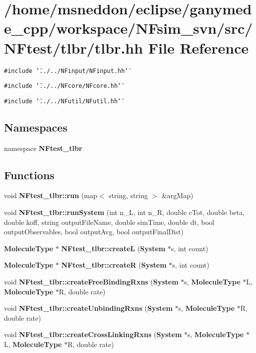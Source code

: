 \section{/home/msneddon/eclipse/ganymede\_\-cpp/workspace/NFsim\_\-svn/src/NFtest/tlbr/tlbr.hh File Reference}
\label{tlbr_8hh}


{\tt \#include \char`\"{}../../NFinput/NFinput.hh\char`\"{}}\par
{\tt \#include \char`\"{}../../NFcore/NFcore.hh\char`\"{}}\par
{\tt \#include \char`\"{}../../NFutil/NFutil.hh\char`\"{}}\par
\subsection*{Namespaces}
\begin{CompactItemize}
\item 
namespace {\bf NFtest\_\-tlbr}
\end{CompactItemize}
\subsection*{Functions}
\begin{CompactItemize}
\item 
void {\bf NFtest\_\-tlbr::run} (map$<$ string, string $>$ \&argMap)
\item 
void {\bf NFtest\_\-tlbr::runSystem} (int n\_\-L, int n\_\-R, double cTot, double beta, double koff, string outputFileName, double simTime, double dt, bool outputObservables, bool outputAvg, bool outputFinalDist)
\item 
{\bf MoleculeType} $\ast$ {\bf NFtest\_\-tlbr::createL} ({\bf System} $\ast$s, int count)
\item 
{\bf MoleculeType} $\ast$ {\bf NFtest\_\-tlbr::createR} ({\bf System} $\ast$s, int count)
\item 
void {\bf NFtest\_\-tlbr::createFreeBindingRxns} ({\bf System} $\ast$s, {\bf MoleculeType} $\ast$L, {\bf MoleculeType} $\ast$R, double rate)
\item 
void {\bf NFtest\_\-tlbr::createUnbindingRxns} ({\bf System} $\ast$s, {\bf MoleculeType} $\ast$R, double rate)
\item 
void {\bf NFtest\_\-tlbr::createCrossLinkingRxns} ({\bf System} $\ast$s, {\bf MoleculeType} $\ast$L, {\bf MoleculeType} $\ast$R, double rate)
\end{CompactItemize}
